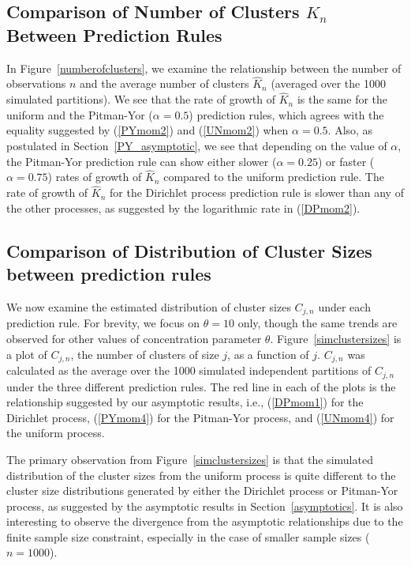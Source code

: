 \documentclass[]{article}
\begin{document}
\subsection{Comparison of Number of Clusters $K_n$ Between Prediction
  Rules}

In Figure~\ref{numberofclusters}, we examine the relationship between
the number of observations $n$ and the average number of clusters
$\hat{K}_n$ (averaged over the 1000 simulated partitions). We see that
the rate of growth of $\hat{K}_n$ is the same for the uniform and the
Pitman-Yor ($\alpha = 0.5$) prediction rules, which agrees with the
equality suggested by (\ref{PYmom2}) and (\ref{UNmom2}) when $\alpha =
0.5$.  Also, as postulated in Section~\ref{PY_asymptotic}, we see that
depending on the value of $\alpha$, the Pitman-Yor prediction rule can
show either slower ($\alpha=0.25$) or faster ($\alpha=0.75$) rates of
growth of $\hat{K}_n$ compared to the uniform prediction rule.  The
rate of growth of $\hat{K}_n$ for the Dirichlet process prediction
rule is slower than any of the other processes, as suggested by the
logarithmic rate in (\ref{DPmom2}).

\subsection{Comparison of Distribution of Cluster Sizes between
  prediction rules}

We now examine the estimated distribution of cluster sizes $C_{j,n}$
under each prediction rule. For brevity, we focus on $\theta = 10$
only, though the same trends are observed for other values of concentration parameter
$\theta$.  Figure~\ref{simclustersizes} is a plot of $C_{j,n}$, the
number of clusters of size $j$, as a function of $j$.  $C_{j,n}$ was
calculated as the average over the 1000 simulated independent
partitions of $C_{j,n}$ under the three different prediction
rules. The red line in each of the plots is the relationship suggested by our
asymptotic results, i.e., (\ref{DPmom1}) for the Dirichlet process,
(\ref{PYmom4}) for the Pitman-Yor process, and (\ref{UNmom4}) for the
uniform process.

The primary observation from Figure~\ref{simclustersizes} is that the
simulated distribution of the cluster sizes from the uniform process
is quite different to the cluster size distributions generated by
either the Dirichlet process or Pitman-Yor process, as suggested by
the asymptotic results in Section~\ref{asymptotics}.  It is also
interesting to observe the divergence from the asymptotic
relationships due to the finite sample size constraint, especially in
the case of smaller sample sizes ($n = 1000$).
\end{document}
